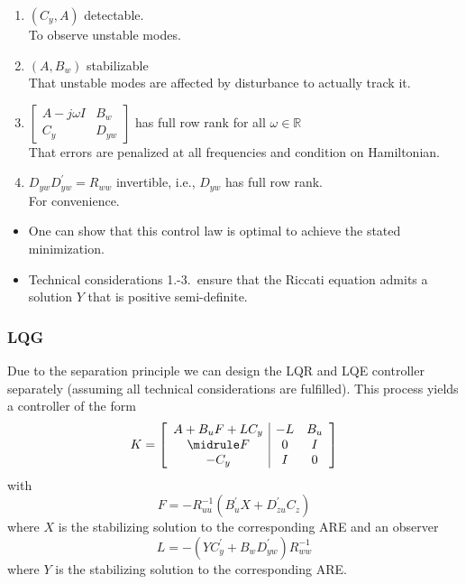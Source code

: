 \begin{enumerate}
    \item $(C_y,A)$ detectable.\\
          To observe unstable modes.
    \item $(A,B_w)$ stabilizable\\
          That unstable modes are affected by disturbance to actually track it.
    \item $\begin{bmatrix}A-j\omega I&B_w\\C_y&D_{yw}\end{bmatrix}$ has full row rank for all $\omega\in\mathbb{R}$\\
          That errors are penalized at all frequencies and condition on Hamiltonian.
    \item $D_{yw} D_{yw}^{\prime}=R_{ww}$ invertible, i.e., $D_{yw}$ has full row rank.\\
          For convenience.
\end{enumerate}


\begin{itemize}
    \item One can show that this control law is optimal to achieve the stated minimization.
    \item Technical considerations 1.-3.\ ensure that the Riccati equation admits a solution $Y$ that is positive semi-definite.
\end{itemize}

\subsubsection{LQG}
Due to the separation principle we can design the LQR and LQE controller separately (assuming all technical considerations are fulfilled). This process yields a controller of the form
\begin{equation*}   %
    K=\left[\begin{array}{c|cc}
        A+B_u F+LC_y & -L & B_u \\
        \midrule
        F          & 0  & I   \\
        -C_y              & I  & 0
    \end{array}\right]
\end{equation*}
with
\begin{equation*}
    F=-R_{uu}^{-1}(B_{u}^{\prime}X+D_{zu}^{\prime}C_{z})
\end{equation*}
where $X$ is the stabilizing solution to the corresponding ARE and an observer
\begin{equation*}
    L=-(YC_y^\prime+B_w D_{yw}^\prime)R_{ww}^{-1}    
\end{equation*}
where $Y$ is the stabilizing solution to the corresponding ARE.

